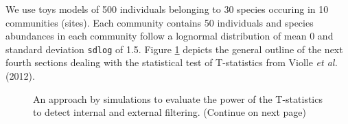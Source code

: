 \documentclass[12pt]{article}\usepackage[]{graphicx}\usepackage[]{color}
\begin{document}
We use toys models of 500 individuals belonging to 30 species occuring in 10 communities (sites). Each community contains 50 individuals and species abundances in each community follow a lognormal distribution of mean 0 and standard deviation \texttt{sdlog} of 1.5.
Figure \ref{fig:General_outline} depicts the general outline of the next fourth sections dealing with the statistical test of T-statistics from Violle \textit{et al.} (2012).

\begin{figure}[ht]
\centering
\hspace*{-0.8cm}
\vspace*{-0.8cm}
\caption[General outline of the simulation concerning the Tstatistics]{An approach by simulations to evaluate the power of the T-statistics to detect internal and external filtering. (Continue on next page) }
\label{fig:General_outline}
\end{figure}
\end{document}

